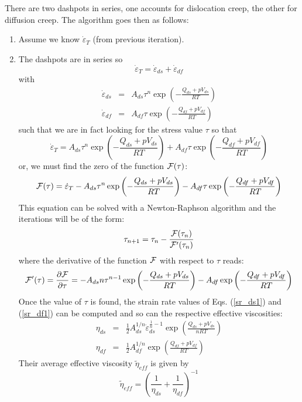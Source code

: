 \begin{itemize}
There are two dashpots in series, one accounts for dislocation creep, the other for diffusion creep.
The algorithm goes then as follows:
\begin{enumerate}
\item Assume we know $\dot\varepsilon_T$ (from previous iteration). 
\item The dashpots are in series so 
\[
\dot\varepsilon_T = \dot\varepsilon_{ds} + \dot\varepsilon_{df} 
\]
with
\begin{eqnarray}
\dot\varepsilon_{ds}  &=& A_{ds} \tau^n \exp \left(-\frac{Q_{ds}+pV_{ds}}{RT}\right) \label{sr_ds1} \\
\dot\varepsilon_{df}  &=& A_{df} \tau   \exp \left(-\frac{Q_{df}+pV_{df}}{RT}\right) \label{sr_df1} 
\end{eqnarray}
such that we are in fact looking for the stress value $\tau$ so that 
\[
\dot\varepsilon_T = 
A_{ds} \tau^n \exp \left(-\frac{Q_{ds}+p V_{ds}}{RT}\right) 
+
A_{df} \tau   \exp \left(-\frac{Q_{df}+p V_{df}}{RT}\right) 
\]
or, we must find the zero of the function ${\cal F}(\tau)$: 
\[
{\cal F}(\tau) =  \dot\varepsilon_T 
- A_{ds} \tau^n \exp \left(-\frac{Q_{ds}+p V_{ds}}{RT}\right) 
- A_{df} \tau   \exp \left(-\frac{Q_{df}+p V_{df}}{RT}\right) 
\]
This equation can be solved with a Newton-Raphson algorithm
and the iterations will be of the form:
\[
\tau_{n+1} = \tau_n - \frac{{\cal F}(\tau_n)}{{\cal F}'(\tau_n)}
\]
where the derivative of the function ${\cal F}$ with respect to $\tau$ reads:
\[
{\cal F}'(\tau)=\frac{\partial {\cal F}}{\partial \tau}=
- A_{ds} n \tau^{n-1} \exp\left(-\frac{Q_{ds}+pV_{ds}}{RT}\right)
- A_{df} \exp\left(-\frac{Q_{df}+pV_{df}}{RT}\right) 
\]
Once the value of $\tau$ is found, 
the strain rate values of Eqs. (\ref{sr_ds1}) and (\ref{sr_df1})
can be computed and so can the respective effective viscosities:
\begin{eqnarray}
\eta_{ds} 
&=& \frac{1}{2} A_{ds}^{1/n} \dot\varepsilon_{ds}^{\frac{1}{n}-1} \exp \left(\frac{Q_{ds}+pV_{ds}}{nRT}\right) \\
\eta_{df} 
&=& \frac{1}{2} A_{df}^{1/n}  \exp \left(\frac{Q_{df}+pV_{df}}{RT}\right) 
\end{eqnarray}
Their average effective viscosity $\tilde{\eta}_{eff}$ is given by 
\[
\tilde{\eta}_{eff} = \left( \frac{1}{\eta_{ds}} + \frac{1}{\eta_{df}} \right)^{-1}
\]
\end{enumerate}



\end{itemize}
